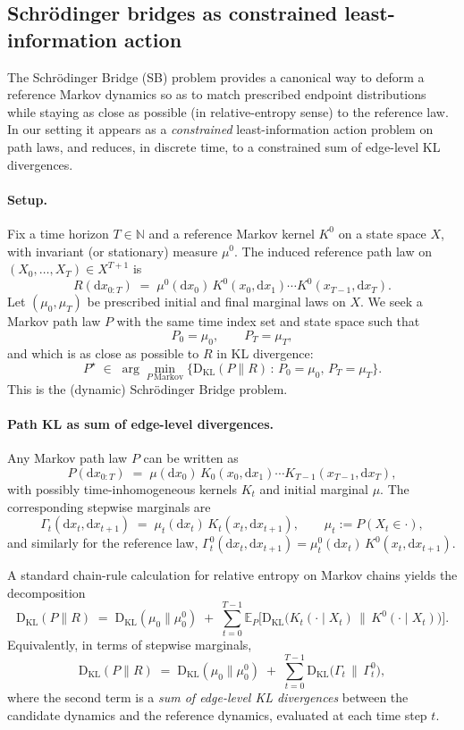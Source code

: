 \documentclass[11pt]{article}
\newcommand{\E}{\mathbb{E}}
\newcommand{\KL}{\mathrm{D}_{\mathrm{KL}}}
\newcommand{\1}{\mathbf{1}}
\begin{document}
\subsection{Schrödinger bridges as constrained least-information action}
\label{app:schrodinger-bridge}

The Schrödinger Bridge (SB) problem provides a canonical way to deform a reference Markov dynamics so as to match prescribed endpoint distributions while staying as close as possible (in relative-entropy sense) to the reference law. In our setting it appears as a \emph{constrained} least-information action problem on path laws, and reduces, in discrete time, to a constrained sum of edge-level KL divergences.

\paragraph{Setup.}
Fix a time horizon $T\in\mathbb N$ and a reference Markov kernel $K^0$ on a state space $X$, with invariant (or stationary) measure $\mu^0$. The induced reference path law on $(X_0,\dots,X_T)\in X^{T+1}$ is
\[
	R(\mathrm dx_{0:T})
	\;=\;
	\mu^0(\mathrm dx_0)\, K^0(x_0,\mathrm dx_1)\cdots K^0(x_{T-1},\mathrm dx_T).
\]
Let $(\mu_0,\mu_T)$ be prescribed initial and final marginal laws on $X$. We seek a Markov path law $P$ with the same time index set and state space such that
\[
	P_0 = \mu_0,
	\qquad
	P_T = \mu_T,
\]
and which is as close as possible to $R$ in KL divergence:
\[
	P^\star
	\;\in\;
	\arg\min_{P\ \text{Markov}}
	\Big\{
  	\KL(P\|R)
  	\,:\,
  	P_0=\mu_0,\,P_T=\mu_T
	\Big\}.
\]
This is the (dynamic) Schrödinger Bridge problem.

\paragraph{Path KL as sum of edge-level divergences.}
Any Markov path law $P$ can be written as
\[
	P(\mathrm dx_{0:T})
	\;=\;
	\mu(\mathrm dx_0)\,K_0(x_0,\mathrm dx_1)\cdots K_{T-1}(x_{T-1},\mathrm dx_T),
\]
with possibly time-inhomogeneous kernels $K_t$ and initial marginal $\mu$. The corresponding stepwise marginals are
\[
	\Gamma_t(\mathrm dx_t,\mathrm dx_{t+1})
	\;=\;
	\mu_t(\mathrm dx_t)\,K_t(x_t,\mathrm dx_{t+1}),
	\qquad
	\mu_t := P(X_t\in\cdot),
\]
and similarly for the reference law,
\(
	\Gamma^0_t(\mathrm dx_t,\mathrm dx_{t+1})
	=
	\mu^0_t(\mathrm dx_t)\,K^0(x_t,\mathrm dx_{t+1})
\).

A standard chain-rule calculation for relative entropy on Markov chains yields the decomposition
\[
	\KL(P\|R)
	\;=\;
	\KL(\mu_0\|\mu_0^0)
	\;+\;
	\sum_{t=0}^{T-1}
	\E_P\Big[
 	\KL\big(
	K_t(\cdot\mid X_t)\,\big\|\,K^0(\cdot\mid X_t)
  	\big)
	\Big].
\]
Equivalently, in terms of stepwise marginals,
\[
	\KL(P\|R)
	\;=\;
	\KL(\mu_0\|\mu_0^0)
	\;+\;
	\sum_{t=0}^{T-1}
	\KL\!\big(
  	\Gamma_t \,\big\|\, \Gamma^0_t
	\big),
\]
where the second term is a \emph{sum of edge-level KL divergences} between the candidate dynamics and the reference dynamics, evaluated at each time step $t$.
\end{document}
